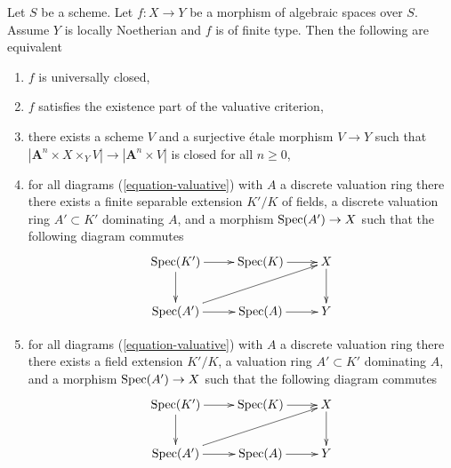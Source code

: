 \begin{lemma}
\label{lemma-check-universally-closed-Noetherian}
Let $S$ be a scheme. Let $f : X \to Y$ be a morphism of algebraic
spaces over $S$. Assume $Y$ is locally Noetherian and $f$ is
of finite type. Then the following are equivalent
\begin{enumerate}
\item $f$ is universally closed,
\item $f$ satisfies the existence part of the valuative criterion,
\item there exists a scheme $V$ and a surjective \'etale morphism
$V \to Y$ such that
$|\mathbf{A}^n \times X \times_Y V| \to |\mathbf{A}^n \times V|$ is closed
for all $n \geq 0$,
\item for all diagrams (\ref{equation-valuative}) with $A$ a discrete
valuation ring there there exists a finite separable extension $K'/K$
of fields, a discrete valuation ring $A' \subset K'$ dominating $A$, and
a morphism $\mathop{\mathrm{Spec}}(A') \to X$ such that the following diagram commutes
$$
\xymatrix{
\Spec(K') \ar[r] \ar[d] & \Spec(K) \ar[r] & X \ar[d] \\
\Spec(A') \ar[r] \ar[rru] & \Spec(A) \ar[r] & Y
}
$$
\item for all diagrams (\ref{equation-valuative}) with $A$ a discrete
valuation ring there there exists a field extension $K'/K$,
a valuation ring $A' \subset K'$ dominating $A$, and
a morphism $\mathop{\mathrm{Spec}}(A') \to X$ such that the following diagram commutes
$$
\xymatrix{
\Spec(K') \ar[r] \ar[d] & \Spec(K) \ar[r] & X \ar[d] \\
\Spec(A') \ar[r] \ar[rru] & \Spec(A) \ar[r] & Y
}
$$
\end{enumerate}
\end{lemma}

